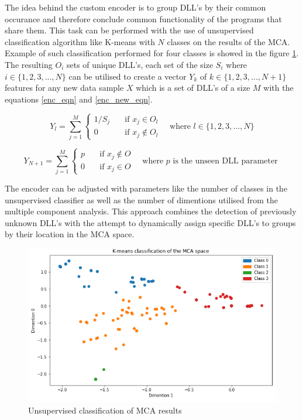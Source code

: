 \documentclass[a4paper,twoside,12pt]{book}
\begin{document}
The idea behind the custom encoder is to group DLL's by their common occurance and therefore
conclude common functionality of the programs that share them. This task can be performed
with the use of unsupervised classification algorithm like K-means with $\mathit{N}$ classes 
on the results of the MCA. Example of such classification
performed for four classes is showed in the figure \ref{fig:kmeanmca}. The resulting 
$\mathit{O_{i}}$ sets of unique DLL's, each set of the size $\mathit{S_{i}}$  where 
$\mathit{i\in\{1, 2, 3,..., N\}}$  can be utilised to create a 
vector $\mathit{Y_{k}}$ of $\mathit{k\in\{1, 2, 3, ..., N + 1\}}$ features for any new 
data sample $\mathit{X}$ which is a set of DLL's of a size $\mathit{M}$ with the equations
\ref{enc_eqn} and \ref{enc_new_eqn}. 

\begin{equation} \label{enc_eqn}
	Y_{l} = 
	\sum_{j=1}^{M}
	\begin{cases}
		1/S_{j}       & \quad \text{if } x_{j} \in O_{l}\\
		0  & \quad \text{if } x_{j} \notin O_{l}
	  \end{cases} \quad \text{where }l \in \{1, 2, 3, ..., N\}
\end{equation}

\begin{equation} \label{enc_new_eqn}
	Y_{N+1} = 
	\sum_{j=1}^{M}
	\begin{cases}
		p      & \quad \text{if } x_{j} \notin O\\
		0  & \quad \text{if } x_{j} \in O
	  \end{cases} \quad \text{where }p \text{ is the unseen DLL parameter }
\end{equation}

The encoder can be adjusted with parameters like the number of classes in the unsupervised 
classifier as well as the number of dimentions utilised from the multiple component analysis. 
This approach combines the detection of previously unknown DLL's with the attempt to dynamically
 assign specific DLL's to groups by their location in the MCA space. 


 \begin{figure}
	\centering
	\includegraphics[scale=0.9]{images/KmeanMCA}
	\caption{Unsupervised classification of MCA results}
	\label{fig:kmeanmca}
 \end{figure}
\end{document}
